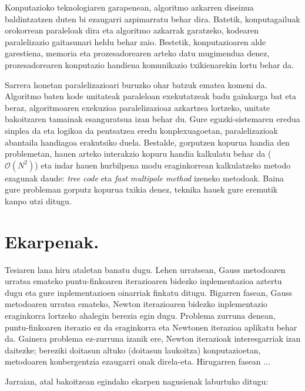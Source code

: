 Konputazioko teknologiaren garapenean, algoritmo azkarren diseinua baldintzatzen duten bi ezaugarri azpimarratu behar dira. Batetik, konputagailuak orokorrean paraleloak dira eta algoritmo azkarrak garatzeko, kodearen paralelizazio gaitasunari heldu behar zaio. Bestetik, konputazioaren alde garestiena, memoria eta prozesadorearen arteko datu mugimendua denez, prozesadorearen konputazio handiena komunikazio txikienarekin lortu behar da. 

Sarrera honetan paralelizazioari buruzko ohar batzuk ematea komeni da. Algoritmo baten kode unitateak paraleloan exekutatzeak badu gainkarga bat eta beraz,  algoritmoaren exekuzioa paralelizazioaz azkartzea lortzeko,  unitate bakoitzaren tamainak esanguratsua izan behar du. Gure eguzki-sistemaren eredua sinplea da eta logikoa da pentsatzea eredu konplexuagoetan, paralelizazioak abantaila handiagoa erakutsiko duela. Bestalde, gorputzen kopurua handia den problemetan, hauen arteko interakzio kopuru  handia kalkulatu behar da ($\mathcal{O}(N^2)$) eta indar hauen hurbilpena modu eraginkorrean kalkulatzeko metodo ezagunak daude: \textit {tree code}\cite{Barnes1986} eta \textit {fast multipole method}\cite{Carrier1988} izeneko metodoak. Baina gure probleman gorputz kopurua txikia denez, teknika hauek gure eremutik kanpo utzi ditugu. 


\section{Ekarpenak.}

Tesiaren lana hiru ataletan banatu dugu. Lehen urratsean, Gauss metodoaren urratsa emateko puntu-finkoaren iterazioaren  bidezko inplementazioa aztertu dugu eta gure inplementazioen oinarriak finkatu ditugu. Bigarren fasean, Gauss metodoaren urratsa emateko, Newton iterazioaren bidezko inplementazio eraginkorra lortzeko ahalegin berezia egin dugu. Problema zurruna denean, puntu-finkoaren iterazio ez da eraginkorra eta Newtonen iterazioa aplikatu behar da. Gainera problema ez-zurruna izanik ere, Newton iterazioak interesgarriak izan daitezke; bereziki doitasun altuko (doitasun laukoitza) konputazioetan, metodoaren konbergentzia ezaugarri onak direla-eta.  Hirugarren fasean ...

Jarraian, atal bakoitzean egindako ekarpen nagusienak laburtuko ditugu:


